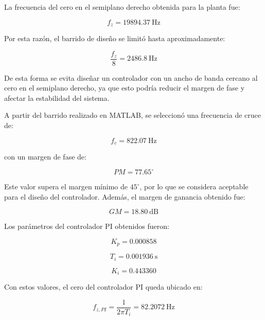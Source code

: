 \documentclass[conference]{IEEEtran}
\begin{document}
La frecuencia del cero en el semiplano derecho obtenida para la planta fue:

\begin{equation}
    f_z=19894.37~\mathrm{Hz}
\end{equation}

Por esta razón, el barrido de diseño se limitó hasta aproximadamente:

\begin{equation}
    \frac{f_z}{8}=2486.8~\mathrm{Hz}
\end{equation}

De esta forma se evita diseñar un controlador con un ancho de banda cercano al cero en el semiplano derecho, ya que esto podría reducir el margen de fase y afectar la estabilidad del sistema.

A partir del barrido realizado en MATLAB, se seleccionó una frecuencia de cruce de:

\begin{equation}
    f_c=822.07~\mathrm{Hz}
\end{equation}

con un margen de fase de:

\begin{equation}
    PM=77.65^\circ
\end{equation}

Este valor supera el margen mínimo de $45^\circ$, por lo que se considera
aceptable para el diseño del controlador. Además, el margen de ganancia obtenido fue:

\begin{equation}
    GM=18.80~\mathrm{dB}
\end{equation}

Los parámetros del controlador PI obtenidos fueron:

\begin{equation}
    K_p=0.000858
\end{equation}

\begin{equation}
    T_i=0.001936~\mathrm{s}
\end{equation}

\begin{equation}
    K_i=0.443360
\end{equation}

Con estos valores, el cero del controlador PI queda ubicado en:

\begin{equation}
    f_{z,PI}=\frac{1}{2\pi T_i}=82.2072~\mathrm{Hz}
\end{equation}
\end{document}
